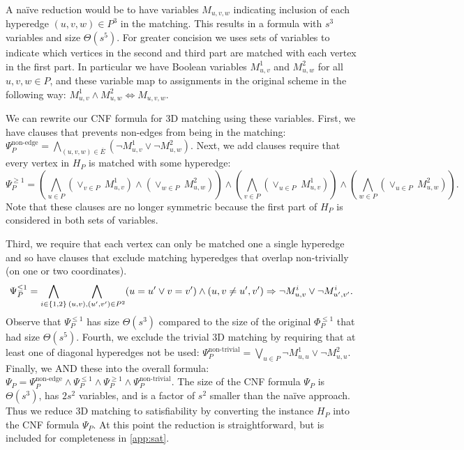 \documentclass[11pt]{article}
\begin{document}
A na\"{i}ve reduction would be to have variables $M_{u,v,w}$ indicating inclusion of each
hyperedge $(u,v,w) \in P^3$ in the matching. This results in a formula with
$s^3$ variables and size $\Theta(s^5)$.
For greater concision we uses sets
of variables to indicate which vertices in the second and third part
are matched with each vertex in the first part.  In particular we have
Boolean variables $M_{u,v}^1$ and $M_{u,w}^2$ for all $u, v, w \in P$,
and these variable map to assignments in the original scheme in the
following way: $M_{u,v}^1 \wedge M_{u,w}^2 \Leftrightarrow M_{u,v,w}$.

We can rewrite our CNF formula for 3D matching using these
variables.  First, we have clauses that prevents non-edges from
being in the matching:
  $\Psi_P^{\text{non-edge}} = \bigwedge_{(u,v,w) \in \overline{E}}
  (\neg M_{u,v}^1 \vee \neg M_{u,w}^2).$
Next, we add clauses require that every vertex in $H_P$ is matched with some
hyperedge:
\begin{equation}
  \Psi_P^{\ge 1} =
  \left(\bigwedge_{u \in P} (\vee_{v\in P} ~M_{u,v}^1) \wedge (\vee_{w \in P} ~M_{u,w}^2)\right)
  \wedge \left(\bigwedge_{v \in P} (\vee_{u \in P} ~M_{u,v}^1)\right)
  \wedge \left(\bigwedge_{w \in P} (\vee_{u \in P} ~M_{u,w}^2)\right).
\end{equation}
Note that these clauses are no longer symmetric because the first part
of $H_P$ is considered in both sets of variables.

Third, we require that each vertex can only be matched one a single
hyperedge and so have clauses that exclude matching hyperedges that
overlap non-trivially (on one or two coordinates).
\begin{equation}
  \Psi_P^{\le 1} = \bigwedge_{i \in \left\{ 1,2 \right\}} \bigwedge_{(u,v),
    (u',v') \in P^2} (u = u' \vee v = v') \wedge (u,v \neq u',v')
  \Rightarrow \neg M_{u,v}^i \vee \neg M_{u',v'}^i.
\end{equation}
Observe that $\Psi_P^{\le 1}$ has size $\Theta(s^3)$ compared to the
size of the original $\Phi_P^{\le 1}$ that had size $\Theta(s^5)$.
Fourth, we exclude the trivial 3D matching by requiring that at least
one of diagonal hyperedges not be used:
  $\Psi_P^{\text{non-trivial}} = \bigvee_{u \in P} \neg M_{u,u}^1 \vee
  \neg M_{u,u}^2.$
Finally, we AND these into the overall formula:
  $\Psi_P = \Psi_P^{\text{non-edge}} \wedge \Psi_P^{\le 1} \wedge
  \Psi_P^{\ge 1} \wedge \Psi_P^{\text{non-trivial}}.$
The size of the CNF formula $\Psi_P$ is $\Theta(s^3)$, has $2s^2$
variables, and is a factor of $s^2$ smaller than the na\"{i}ve
approach.  Thus we reduce 3D matching to satisfiability by converting the
instance $H_P$ into the CNF formula $\Psi_P$.  At this point the
reduction is straightforward, but is included for completeness in
\autoref{app:sat}.
\end{document}
